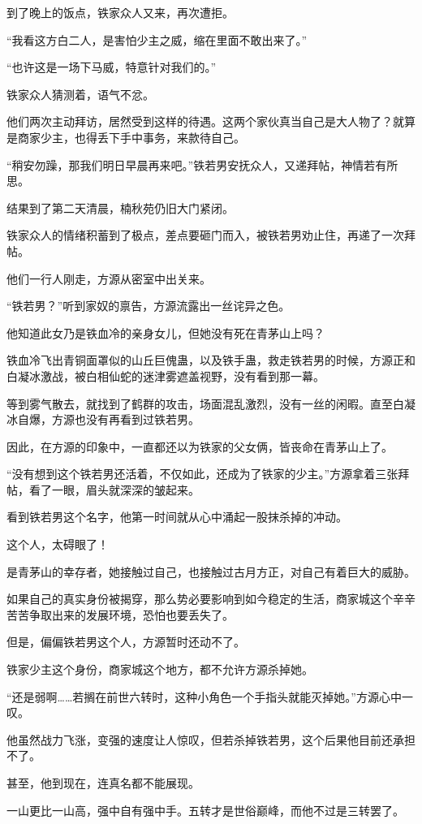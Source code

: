 \begin{this_body}
到了晚上的饭点，铁家众人又来，再次遭拒。

“我看这方白二人，是害怕少主之威，缩在里面不敢出来了。”

“也许这是一场下马威，特意针对我们的。”

铁家众人猜测着，语气不忿。

他们两次主动拜访，居然受到这样的待遇。这两个家伙真当自己是大人物了？就算是商家少主，也得丢下手中事务，来款待自己。

“稍安勿躁，那我们明日早晨再来吧。”铁若男安抚众人，又递拜帖，神情若有所思。

结果到了第二天清晨，楠秋苑仍旧大门紧闭。

铁家众人的情绪积蓄到了极点，差点要砸门而入，被铁若男劝止住，再递了一次拜帖。

他们一行人刚走，方源从密室中出关来。

“铁若男？”听到家奴的禀告，方源流露出一丝诧异之色。

他知道此女乃是铁血冷的亲身女儿，但她没有死在青茅山上吗？

铁血冷飞出青铜面罩似的山丘巨傀蛊，以及铁手蛊，救走铁若男的时候，方源正和白凝冰激战，被白相仙蛇的迷津雾遮盖视野，没有看到那一幕。

等到雾气散去，就找到了鹤群的攻击，场面混乱激烈，没有一丝的闲暇。直至白凝冰自爆，方源也没有再看到过铁若男。

因此，在方源的印象中，一直都还以为铁家的父女俩，皆丧命在青茅山上了。

“没有想到这个铁若男还活着，不仅如此，还成为了铁家的少主。”方源拿着三张拜帖，看了一眼，眉头就深深的皱起来。

看到铁若男这个名字，他第一时间就从心中涌起一股抹杀掉的冲动。

这个人，太碍眼了！

是青茅山的幸存者，她接触过自己，也接触过古月方正，对自己有着巨大的威胁。

如果自己的真实身份被揭穿，那么势必要影响到如今稳定的生活，商家城这个辛辛苦苦争取出来的发展环境，恐怕也要丢失了。

但是，偏偏铁若男这个人，方源暂时还动不了。

铁家少主这个身份，商家城这个地方，都不允许方源杀掉她。

“还是弱啊……若搁在前世六转时，这种小角色一个手指头就能灭掉她。”方源心中一叹。

他虽然战力飞涨，变强的速度让人惊叹，但若杀掉铁若男，这个后果他目前还承担不了。

甚至，他到现在，连真名都不能展现。

一山更比一山高，强中自有强中手。五转才是世俗巅峰，而他不过是三转罢了。


\end{this_body}
